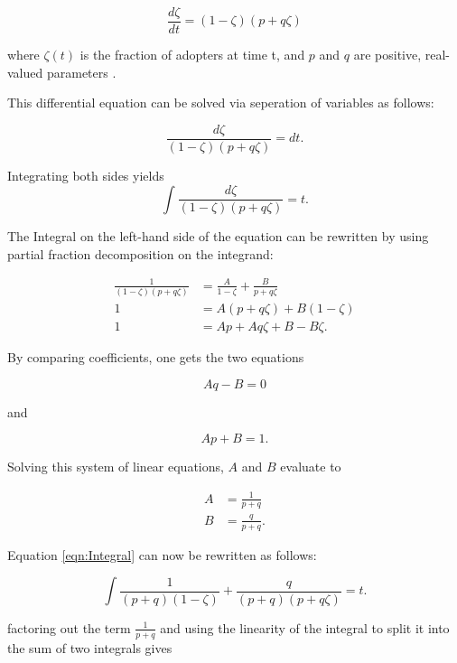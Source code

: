 \documentclass[11pt]{article}
\begin{document}
	\begin{equation} \label{eqn:Bass}
		\frac{d\zeta}{dt} = (1-\zeta) (p+q\zeta)
	\end{equation}
	
	where $\zeta(t)$ is the fraction of adopters at time t, and $p$ and $q$ are positive, real-valued parameters \autocite{Bass69}.
	
	This differential equation can be solved via seperation of variables as follows:
	
	$$
	\frac{d\zeta}{(1-\zeta)(p+q\zeta)} = dt.
	$$
	
	Integrating both sides yields
	\begin{equation} \label{eqn:Integral}
		\int \frac{d\zeta}{(1-\zeta)(p+q\zeta)} = t.
	\end{equation}
	
	The Integral on the left-hand side of the equation can be rewritten by using partial fraction decomposition on the integrand:
	
	\begin{equation*}
		\begin{split}
			\frac{1}{(1-\zeta)(p+q\zeta)} &= \frac{A}{1-\zeta}+ \frac{B}{p+q\zeta} \\
			1 &= A(p+q\zeta) + B(1-\zeta) \\
			1 &= Ap + Aq\zeta + B - B\zeta.
		\end{split}
	\end{equation*}
	
	
	By comparing coefficients, one gets the two equations
	
	$$ Aq - B = 0 $$
	
	and
	
	$$ Ap + B = 1. $$
	
	Solving this system of linear equations, $A$ and $B$ evaluate to
	
	\begin{equation*}
		\begin{split}
			A &= \frac{1}{p+q} \\
			B &= \frac{q}{p+q}.
		\end{split}
	\end{equation*}
	
	Equation \ref{eqn:Integral} can now be rewritten as follows:
	
	$$
	\int\frac{1}{(p+q)(1-\zeta)} + \frac{q}{(p+q)(p+q\zeta)} =t.
	$$
	
	factoring out the term $\frac{1}{p+q}$ and using the linearity of the integral to split it into the sum of two integrals gives
	
\end{document}
